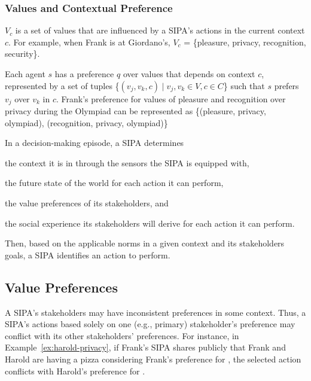 \subsubsection{Values and Contextual Preference}
$V_c$ is a set of values that are influenced by a SIPA's actions in the current context $c$. 
% 
For example, when Frank is at Giordano's, $V_c$ = \{pleasure, privacy, recognition, security\}.

Each agent $s$ has a preference $q$ over values that depends on context $c$,
represented by a set of tuples \{$(v_j, v_k, c) \mid v_j, v_k \in V, c \in C$\} such that $s$ prefers $v_j$ over $v_k$ in $c$. Frank's preference for values of pleasure and recognition over privacy during the 
Olympiad can be represented as \{(pleasure, privacy, olympiad), (recognition, privacy, olympiad)\}



In a decision-making episode, a SIPA determines
\begin{enumerate*}[label=(\arabic*)]
\item the context it is in through the sensors the SIPA is equipped with,
\item the future state of the world for each action it can perform,
\item the value preferences of its stakeholders, and
\item the social experience its stakeholders will derive for each action it can perform.
\end{enumerate*}
Then, based on the applicable norms in a given context and its
stakeholders goals, a SIPA identifies an action to perform.

\subsection{Value Preferences}

A SIPA's stakeholders may have inconsistent preferences in some context. Thus, a SIPA's actions based solely on one (e.g., primary)
stakeholder's preference may conflict with its other stakeholders'
preferences. For instance, in Example~\ref{ex:harold-privacy}, if
Frank's SIPA shares publicly that Frank and Harold are having a pizza
considering Frank's preference for , the selected action 
conflicts with Harold's preference for .

